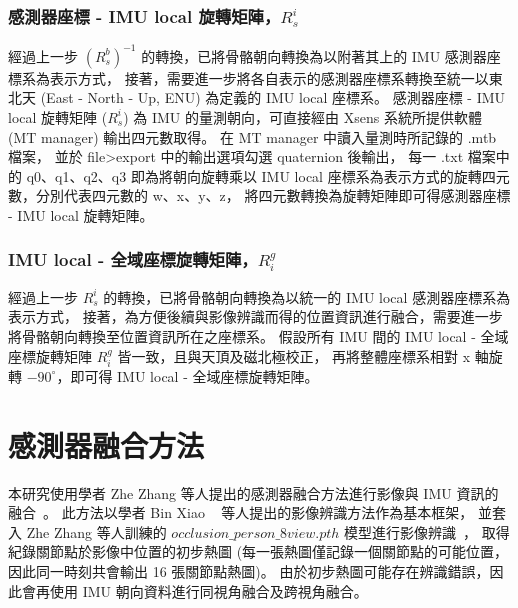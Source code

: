 \subsubsection{感測器座標 - IMU local 旋轉矩陣，$R^i_s$}
經過上一步 $(R^b_s)^{-1}$ 的轉換，已將骨骼朝向轉換為以附著其上的 IMU 感測器座標系為表示方式，
接著，需要進一步將各自表示的感測器座標系轉換至統一以東北天 (East - North - Up, ENU) 為定義的 IMU local 座標系。
感測器座標 - IMU local 旋轉矩陣 ($R^i_s$) 為 IMU 的量測朝向，可直接經由 Xsens 系統所提供軟體 (MT manager) 輸出四元數取得。
在 MT manager 中讀入量測時所記錄的 .mtb 檔案，
並於 file>export 中的輸出選項勾選 quaternion 後輸出，
每一 .txt 檔案中的 q0、q1、q2、q3 即為將朝向旋轉乘以 IMU local 座標系為表示方式的旋轉四元數，分別代表四元數的 w、x、y、z，
將四元數轉換為旋轉矩陣即可得感測器座標 - IMU local 旋轉矩陣。

\subsubsection{IMU local - 全域座標旋轉矩陣，$R^g_i$}
經過上一步 $R^i_s$ 的轉換，已將骨骼朝向轉換為以統一的 IMU local 感測器座標系為表示方式，
接著，為方便後續與影像辨識而得的位置資訊進行融合，需要進一步將骨骼朝向轉換至位置資訊所在之座標系。
假設所有 IMU 間的 IMU local - 全域座標旋轉矩陣 $R^g_i$ 皆一致，且與天頂及磁北極校正，
再將整體座標系相對 x 軸旋轉 $-90^{\circ}$，即可得 IMU local - 全域座標旋轉矩陣。

\section{感測器融合方法}
本研究使用學者 Zhe Zhang 等人提出的感測器融合方法進行影像與 IMU 資訊的融合~\cite{Zhang_2020_CVPR}。
此方法以學者 Bin Xiao ~\cite{Xiao_2018_ECCV} 等人提出的影像辨識方法作為基本框架，
並套入 Zhe Zhang 等人訓練的 $occlusion\_person\_8view.pth$ 模型進行影像辨識~\cite{zhang2020adafuse}，
取得紀錄關節點於影像中位置的初步熱圖 (每一張熱圖僅記錄一個關節點的可能位置，因此同一時刻共會輸出 16 張關節點熱圖)。
由於初步熱圖可能存在辨識錯誤，因此會再使用 IMU 朝向資料進行同視角融合及跨視角融合。

